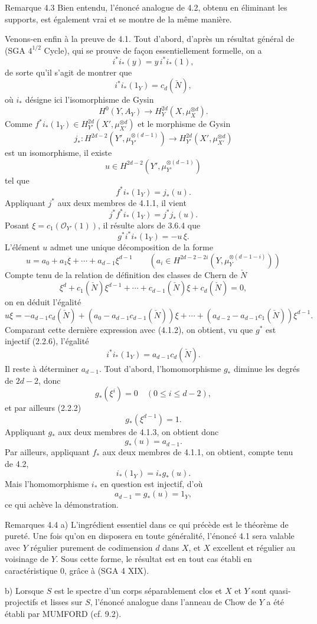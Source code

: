 \begin{statement}{Remarque 4.3}
Bien entendu, l'énoncé analogue de 4.2, obtenu en éliminant les supports, est également vrai et se montre de la même manière.
\end{statement}

Venons-en enfin à la preuve de 4.1. Tout d'abord, d'après un résultat général de (SGA $4^{1/2}$ Cycle), qui se prouve de façon essentiellement formelle, on a
\[
i^*i_*(y)=y\,i^*i_*(1),
\]
de sorte qu'il s'agit de montrer que
\[
i^*i_*(1_Y)=c_d(\check N),
\]
où $i_*$ désigne ici l'isomorphisme de Gysin
\[
H^0(Y,A_Y)\to H_Y^{2d}(X,\mu_X^{\otimes d}).
\]
Comme $f^*i_*(1_Y)\in H_{Y'}^{2d}(X',\mu_{X'}^{\otimes d})$ et le morphisme de Gysin
\[
j_*:H^{2d-2}(Y',\mu_{Y'}^{\otimes(d-1)})
\to H_{Y'}^{2d}(X',\mu_{X'}^{\otimes d})
\]
est un isomorphisme, il existe
\[
u\in H^{2d-2}(Y',\mu_{Y'}^{\otimes(d-1)})
\]
tel que
\[
f^*i_*(1_Y)=j_*(u).
\tag{4.1.1}
\]
Appliquant $j^*$ aux deux membres de 4.1.1, il vient
\[
j^*f^*i_*(1_Y)=j^*j_*(u).
\]
Posant $\xi=c_1(\mathcal{O}_{Y'}(1))$, il résulte alors de 3.6.4 que
\[
g^*i^*i_*(1_Y)=-u\,\xi.
\tag{4.1.2}
\]
L'élément $u$ admet une unique décomposition de la forme
\[
u=a_0+a_1\xi+\cdots+a_{d-1}\xi^{d-1}
\qquad
(a_i\in H^{2d-2-2i}(Y,\mu_Y^{\otimes(d-1-i)}))
\tag{4.1.3}
\]
Compte tenu de la relation de définition des classes de Chern de $\check N$
\[
\xi^d+c_1(\check N)\xi^{d-1}+\cdots+c_{d-1}(\check N)\xi+c_d(\check N)=0,
\tag{4.1.4}
\]
on en déduit l'égalité
\[
u\xi=-a_{d-1}c_d(\check N)+(a_0-a_{d-1}c_{d-1}(\check N))\xi
+\cdots+(a_{d-2}-a_{d-1}c_1(\check N))\xi^{d-1}.
\]
Comparant cette dernière expression avec (4.1.2), on obtient, vu que $g^*$ est injectif (2.2.6), l'égalité
\[
i^*i_*(1_Y)=a_{d-1}c_d(\check N).
\tag{4.1.5}
\]
Il reste à déterminer $a_{d-1}$. Tout d'abord, l'homomorphisme $g_*$ diminue les degrés de $2d-2$, donc
\[
g_*(\xi^i)=0\quad(0\le i\le d-2),
\]
et par ailleurs (2.2.2)
\[
g_*(\xi^{d-1})=1.
\]
Appliquant $g_*$ aux deux membres de 4.1.3, on obtient donc
\[
g_*(u)=a_{d-1}.
\tag{4.1.6}
\]
Par ailleurs, appliquant $f_*$ aux deux membres de 4.1.1, on obtient, compte tenu de 4.2,
\[
i_*(1_Y)=i_*g_*(u).
\tag{4.1.7}
\]
Mais l'homomorphisme $i_*$ en question est injectif, d'où
\[
a_{d-1}=g_*(u)=1_Y,
\]
ce qui achève la démonstration.

\begin{statement}{Remarques 4.4}
a) L'ingrédient essentiel dans ce qui précède est le théorème de pureté. Une fois qu'on en disposera en toute généralité, l'énoncé 4.1 sera valable avec $Y$ régulier purement de codimension $d$ dans $X$, et $X$ excellent et régulier au voisinage de $Y$. Sous cette forme, le résultat est en tout cas établi en caractéristique $0$, grâce à (SGA 4 XIX).

b) Lorsque $S$ est le spectre d'un corps séparablement clos et $X$ et $Y$
sont quasi-projectifs et lisses sur $S$, l'énoncé analogue dans l'anneau de Chow de $Y$ a été établi par MUMFORD (cf. 9.2).
\end{statement}

